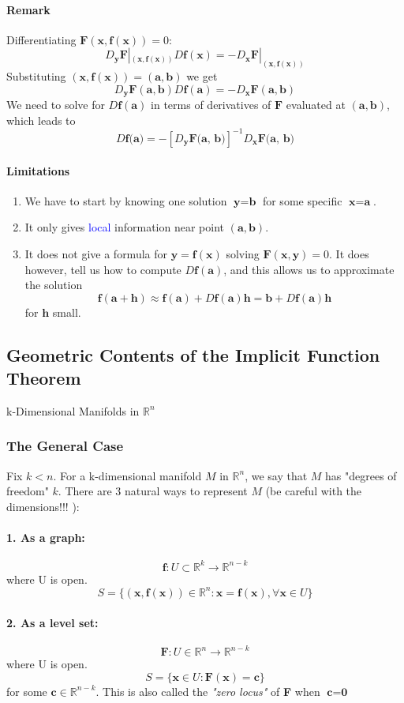 \documentclass[11pt]{article}
\newcommand{\ti}[1]{\textit{#1}}
\newcommand{\tb}[1]{\textbf{#1}}
\newcommand{\real}[0]{\mathbb{R}}
\newcommand{\func}[3]{\tb{#1}: {#2} \rightarrow {#3} }
\newcommand{\vx}[0]{\tb{x}}
\newcommand{\vy}[0]{\tb{y}}
\newcommand{\va}[0]{\tb{a}}
\newcommand{\vb}[0]{\tb{b}}
\newcommand{\vh}[0]{\tb{h}}
\newcommand{\vf}[0]{\tb{F}}
\newcommand{\ff}[0]{\tb{f}}
\begin{document}
\paragraph{Remark} 
Differentiating $\vf(\vx, \ff(\vx)) = 0$:
$$D_\vy\vf|_{(\vx, \ff(\vx))}D\ff(\vx) = -D_\vx\vf|_{(\vx,\ff(\vx))}$$
Substituting $(\vx, \ff(\vx)) = (\va, \vb)$ we get
$$D_\vy\vf(\va, \vb)D\ff(\va) = -D_\vx\vf(\va,\vb)$$
We need to solve for $D\ff(\va)$ in terms of derivatives of $\vf$ evaluated at $(\va, \vb)$, which leads to
$$D\tb{f(a)} = -[D_\tb{y}\tb{F(a, b)}]^{-1}D_\tb{x}\tb{F(a, b)}$$
\paragraph{Limitations}
\begin{enumerate}
	\item We have to start by knowing one solution $\vy = \vb$ for some specific $\vx = \va$.
	\item It only gives \textcolor{blue}{local} information near point $(\va, \vb)$.
	\item It does not give a formula for $\vy = \ff(\vx)$ solving $\vf(\vx,\vy) = 0$. It does however, tell us how to compute $D\ff(\va)$, and this allows us to approximate the solution
	$$\ff(\va + \vh) \approx \ff(\va) + D\ff(\va)\vh = \vb + D\ff(\va)\vh$$
	for $\vh$ small.
\end{enumerate}


\subsection{Geometric Contents of the Implicit Function Theorem}
k-Dimensional Manifolds in $\real^n$
\subsubsection{The General Case}
Fix $k < n$. For a k-dimensional manifold $M$ in $\real^n$, we say that $M$ has "degrees of freedom" $k$. There are 3 natural ways to represent $M$ (be careful with the dimensions!!! ):
\paragraph{1. As a \tb{graph}:}
        $$\func{f}{U \subset \real^k}{\real^{n-k}}$$ where U is open.
        $$ S = \{(\tb{x}, \tb{f}(\tb{x})) \in \real^n: \tb{x} = \tb{f}(\tb{x}), \forall \tb{x} \in U \}$$
\paragraph{2. As a \tb{level set}:}
    $$ \func{F}{U\in \real^n}{\real^{n-k}}$$ where U is open.
    $$ S = \{\tb{x} \in U: \tb{F}(\tb{x}) = \tb{c}\}$$ for some $\tb{c} \in \real^{n-k}$.\newline
    This is also called the \ti{"zero locus"} of \tb{F} when $\tb{c} = \tb{0}$
\end{document}
